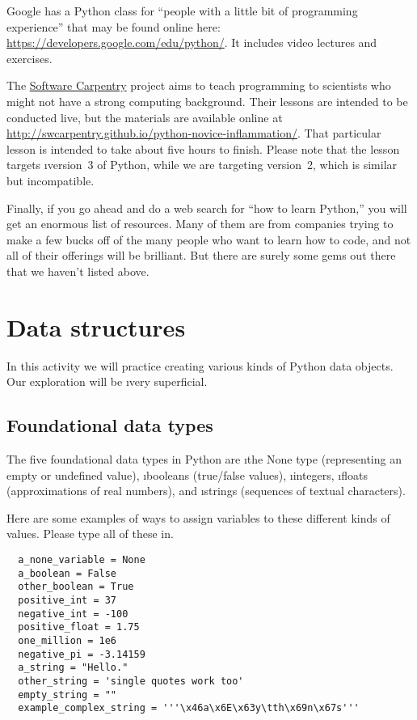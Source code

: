 \documentclass[letterpaper, 12pt, titlepage, twoside]{article}
\begin{document}
Google has a Python class for ``people with a little bit of programming
experience'' that may be found online here:
\url{https://developers.google.com/edu/python/}. It includes video lectures
and exercises.

The \href{https://software-carpentry.org/}{Software Carpentry} project aims to
teach programming to scientists who might not have a strong computing
background. Their lessons are intended to be conducted live, but the materials
are available online at
\url{http://swcarpentry.github.io/python-novice-inflammation/}. That
particular lesson is intended to take about five hours to finish. Please note
that the lesson targets \i{version~3} of Python, while we are targeting
version~2, which is similar but incompatible.

Finally, if you go ahead and do a web search for ``how to learn Python,'' you
will get an enormous list of resources. Many of them are from companies trying
to make a few bucks off of the many people who want to learn how to code, and
not all of their offerings will be brilliant. But there are surely some gems
out there that we haven't listed above.




\newpage
\section{Data structures}

In this activity we will practice creating various kinds of Python data
objects. Our exploration will be \i{very} superficial.

\subsection*{Foundational data types}

The five foundational data types in Python are \i{the None type} (representing
an empty or undefined value), \i{booleans} (true/false values), \i{integers},
\i{floats} (approximations of real numbers), and \i{strings} (sequences of
textual characters).

Here are some examples of ways to assign variables to these different kinds of
values. Please type all of these in.

\begin{lstlisting}
  a_none_variable = None
  a_boolean = False
  other_boolean = True
  positive_int = 37
  negative_int = -100
  positive_float = 1.75
  one_million = 1e6
  negative_pi = -3.14159
  a_string = "Hello."
  other_string = 'single quotes work too'
  empty_string = ""
  example_complex_string = '''\x46a\x6E\x63y\tth\x69n\x67s'''
\end{lstlisting}
\end{document}
